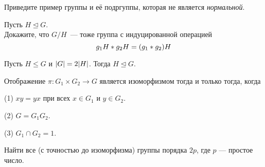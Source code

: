 \documentclass{article}
\begin{document}
    \begin{task_boxed}
        Приведите пример группы и её подргуппы, которая не является \textit{нормальной}.
    \end{task_boxed}

    \begin{task_boxed}
        Пусть $H \trianglelefteq G$.\\
        Докажите, что $G/H$~--- тоже группа с индуцированной операцией
        \[g_{1}H \ast g_{2}H = \lr*{g_{1} \ast g_{2}}H\]
    \end{task_boxed}

    \begin{task_boxed}
        Пусть $H \leq G$ и $\abs*{G} = 2\abs*{H}$.
        Тогда $H \trianglelefteq G$.\\
    \end{task_boxed}

    \begin{task_boxed}
        Отображение $\pi : G_1 \times G_2 \to G$ является изоморфизмом тогда и только тогда, когда

        (1) $xy=yx$ при всех $x \in G_1$ и $y \in G_2$.

        (2) $G = G_1 G_2$.

        (3) $G_1 \cap G_2 = {1}$.
    \end{task_boxed}

    \begin{task_boxed}[ *]
        Найти все (с точностью до изоморфизма) группы порядка $2p$, где $p$ — простое число.
    \end{task_boxed}
\end{document}
